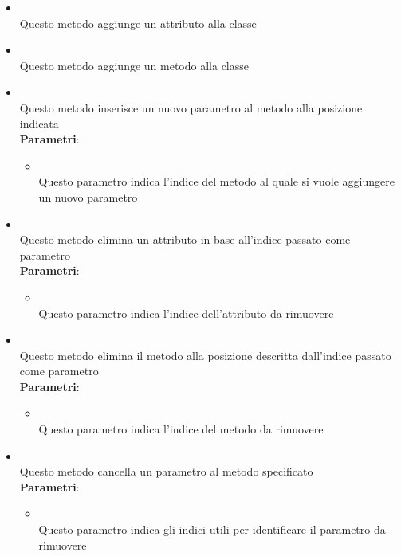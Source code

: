 \begin{itemize}
\begin{itemize}
\item {}
\\ Questo metodo aggiunge un attributo alla classe
\item {}
\\ Questo metodo aggiunge un metodo alla classe
\item {}
\\ Questo metodo inserisce un nuovo parametro al metodo alla posizione indicata
\\ \textbf{Parametri}:
\begin{itemize}
\item {}
\\ Questo parametro indica l'indice del metodo al quale si vuole aggiungere un nuovo parametro
\end{itemize}
\item {}
\\ Questo metodo elimina un attributo in base all'indice passato come parametro
\\ \textbf{Parametri}:
\begin{itemize}
\item {}
\\ Questo parametro indica l'indice dell'attributo da rimuovere
\end{itemize}
\item {}
\\ Questo metodo elimina il metodo alla posizione descritta dall'indice passato come parametro
\\ \textbf{Parametri}:
\begin{itemize}
\item {}
\\ Questo parametro indica l'indice del metodo da rimuovere 
\end{itemize}
\item {}
\\ Questo metodo cancella un parametro al metodo specificato
\\ \textbf{Parametri}:
\begin{itemize}
\item {}
\\ Questo parametro indica gli indici utili per identificare il parametro da rimuovere
\end{itemize}
\end{itemize}
\end{itemize}

